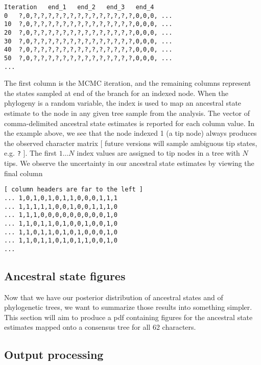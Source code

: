 {\tt \begin{snugshade*}
\begin{lstlisting}
Iteration	end_1	end_2	end_3	end_4
0	?,0,?,?,?,?,?,?,?,?,?,?,?,?,?,?,0,0,0, ...
10	?,0,?,?,?,?,?,?,?,?,?,?,?,?,?,?,0,0,0, ...
20	?,0,?,?,?,?,?,?,?,?,?,?,?,?,?,?,0,0,0, ...
30	?,0,?,?,?,?,?,?,?,?,?,?,?,?,?,?,0,0,0, ...
40	?,0,?,?,?,?,?,?,?,?,?,?,?,?,?,?,0,0,0, ...
50	?,0,?,?,?,?,?,?,?,?,?,?,?,?,?,?,0,0,0, ...
...
\end{lstlisting}
\end{snugshade*}}

The first column is the MCMC iteration, and the remaining columns represent the states sampled at end of the branch for an indexed node.
When the phylogeny is a random variable, the index is used to map an ancestral state estimate to the node in any given tree sample from the analysis.
The vector of comma-delimited ancestral state estimates is reported for each column value.
In the example above, we see that the node indexed 1 (a tip node) always produces the observed character matrix [ future versions will sample ambiguous tip states, e.g. {\tt ?} ].
The first $1 \ldots N$ index values are assigned to tip nodes in a tree with $N$ tips.
We observe the uncertainty in our ancestral state estimates by viewing the final column

{\tt \begin{snugshade*}
\begin{lstlisting}
[ column headers are far to the left ]
... 1,0,1,0,1,0,1,1,0,0,0,1,1,1
... 1,1,1,1,1,0,0,1,0,0,1,1,1,0
... 1,1,1,0,0,0,0,0,0,0,0,0,1,0
... 1,1,0,1,1,0,1,0,0,1,0,0,1,0
... 1,1,0,1,1,0,1,0,1,0,0,0,1,0
... 1,1,0,1,1,0,1,0,1,1,0,0,1,0
...
\end{lstlisting}
\end{snugshade*}}

\subsection{Ancestral state figures}

Now that we have our posterior distribution of ancestral states and of phylogenetic trees, we want to summarize those results into something simpler.
This section will aim to produce a pdf containing figures for the ancestral state estimates mapped onto a consensus tree for all 62 characters.

\subsection{Output processing}

